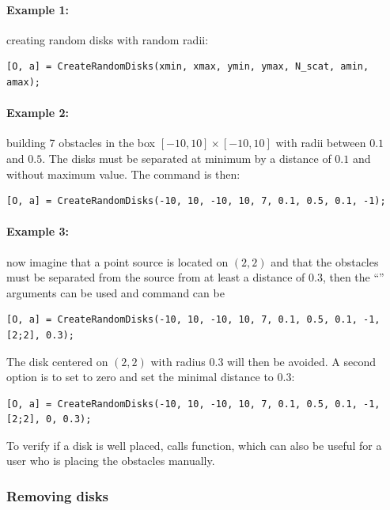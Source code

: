 \paragraph{Example 1:} creating  random disks with random radii:
\begin{lstlisting}
[O, a] = CreateRandomDisks(xmin, xmax, ymin, ymax, N_scat, amin, amax);
\end{lstlisting}
\paragraph{Example 2:} building 7 obstacles in the box $[-10,10]\times[-10,10]$ with radii between $0.1$ and $0.5$. The disks must be separated at minimum by a distance of $0.1$ and without maximum value. The command is then:
\begin{lstlisting}
[O, a] = CreateRandomDisks(-10, 10, -10, 10, 7, 0.1, 0.5, 0.1, -1);
\end{lstlisting}
\paragraph{Example 3:} now imagine that a point source is located on $(2,2)$ and that the obstacles must be separated from the source from at least a distance of $0.3$, then the ``'' arguments can be used and command can be
\begin{lstlisting}
[O, a] = CreateRandomDisks(-10, 10, -10, 10, 7, 0.1, 0.5, 0.1, -1, [2;2], 0.3);
\end{lstlisting}
The disk centered on $(2,2)$ with radius $0.3$ will then be avoided. A second option is to set  to zero and set the minimal distance  to $0.3$:
\begin{lstlisting}
[O, a] = CreateRandomDisks(-10, 10, -10, 10, 7, 0.1, 0.5, 0.1, -1, [2;2], 0, 0.3);
\end{lstlisting}


\begin{remark}
\label{secFun:CheckPlacement}
To verify if a disk is well placed, \CreateRandomDisks calls \CheckPlacement function, which can also be useful for a user who is placing the obstacles manually.
\end{remark}

\subsubsection{Removing disks}
\label{secFun:RemoveDisk}

